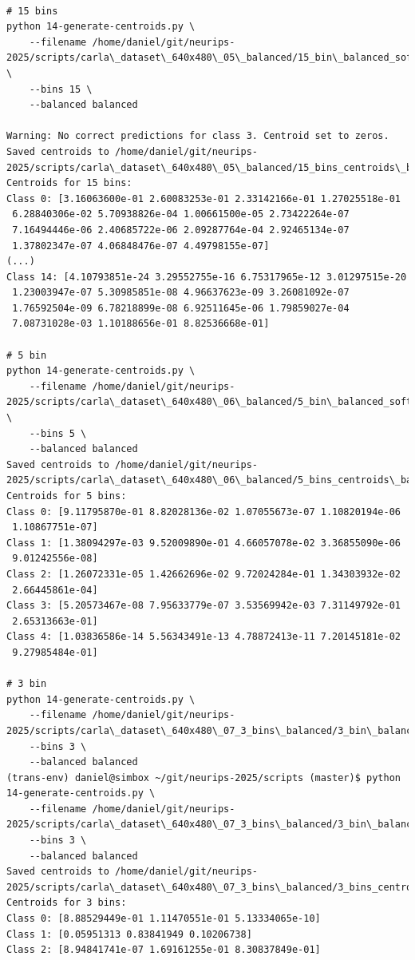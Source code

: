 \begin{verbatim}

# 15 bins
python 14-generate-centroids.py \
    --filename /home/daniel/git/neurips-2025/scripts/carla\_dataset\_640x480\_05\_balanced/15_bin\_balanced_softmax_outputs.npy \
    --bins 15 \
    --balanced balanced

Warning: No correct predictions for class 3. Centroid set to zeros.
Saved centroids to /home/daniel/git/neurips-2025/scripts/carla\_dataset\_640x480\_05\_balanced/15_bins_centroids\_balanced.npy
Centroids for 15 bins:
Class 0: [3.16063600e-01 2.60083253e-01 2.33142166e-01 1.27025518e-01
 6.28840306e-02 5.70938826e-04 1.00661500e-05 2.73422264e-07
 7.16494446e-06 2.40685722e-06 2.09287764e-04 2.92465134e-07
 1.37802347e-07 4.06848476e-07 4.49798155e-07]
(...)
Class 14: [4.10793851e-24 3.29552755e-16 6.75317965e-12 3.01297515e-20
 1.23003947e-07 5.30985851e-08 4.96637623e-09 3.26081092e-07
 1.76592504e-09 6.78218899e-08 6.92511645e-06 1.79859027e-04
 7.08731028e-03 1.10188656e-01 8.82536668e-01]

# 5 bin
python 14-generate-centroids.py \
    --filename /home/daniel/git/neurips-2025/scripts/carla\_dataset\_640x480\_06\_balanced/5_bin\_balanced_softmax_outputs.npy \
    --bins 5 \
    --balanced balanced
Saved centroids to /home/daniel/git/neurips-2025/scripts/carla\_dataset\_640x480\_06\_balanced/5_bins_centroids\_balanced.npy
Centroids for 5 bins:
Class 0: [9.11795870e-01 8.82028136e-02 1.07055673e-07 1.10820194e-06
 1.10867751e-07]
Class 1: [1.38094297e-03 9.52009890e-01 4.66057078e-02 3.36855090e-06
 9.01242556e-08]
Class 2: [1.26072331e-05 1.42662696e-02 9.72024284e-01 1.34303932e-02
 2.66445861e-04]
Class 3: [5.20573467e-08 7.95633779e-07 3.53569942e-03 7.31149792e-01
 2.65313663e-01]
Class 4: [1.03836586e-14 5.56343491e-13 4.78872413e-11 7.20145181e-02
 9.27985484e-01]

# 3 bin
python 14-generate-centroids.py \
    --filename /home/daniel/git/neurips-2025/scripts/carla\_dataset\_640x480\_07_3_bins\_balanced/3_bin\_balanced_softmax_outputs.npy\
    --bins 3 \
    --balanced balanced
(trans-env) daniel@simbox ~/git/neurips-2025/scripts (master)$ python 14-generate-centroids.py \
    --filename /home/daniel/git/neurips-2025/scripts/carla\_dataset\_640x480\_07_3_bins\_balanced/3_bin\_balanced_softmax_outputs.npy\
    --bins 3 \
    --balanced balanced
Saved centroids to /home/daniel/git/neurips-2025/scripts/carla\_dataset\_640x480\_07_3_bins\_balanced/3_bins_centroids\_balanced.npy
Centroids for 3 bins:
Class 0: [8.88529449e-01 1.11470551e-01 5.13334065e-10]
Class 1: [0.05951313 0.83841949 0.10206738]
Class 2: [8.94841741e-07 1.69161255e-01 8.30837849e-01]
\end{verbatim}

